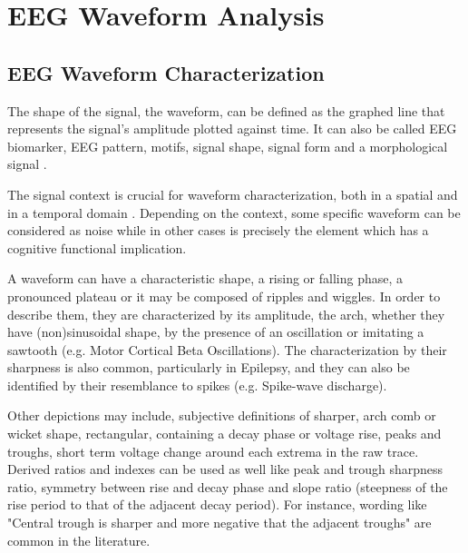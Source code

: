 \section{EEG Waveform Analysis}

\subsection{EEG Waveform Characterization}

The shape of the signal, the waveform, can be defined as the graphed line that represents the signal's amplitude plotted against time. It can also be called EEG biomarker,  EEG pattern, motifs, signal shape, signal form and a morphological signal \cite{Jansen1991}.

The signal context is crucial for waveform characterization, both in a spatial and in a temporal domain \cite{Jansen1991}.  Depending on the context, some specific waveform can be considered as noise while in other cases is precisely the element which has a cognitive functional implication.



%

A waveform can have a characteristic shape, a rising or falling phase, a pronounced plateau or it may be composed of ripples and wiggles. In order to describe them, they are characterized by its amplitude, the arch, whether they have (non)sinusoidal shape, by the presence of an oscillation or imitating a sawtooth (e.g. Motor Cortical Beta Oscillations).  The characterization by their sharpness is also common, particularly in Epilepsy, and they can also be identified by their resemblance to spikes (e.g. Spike-wave discharge).

Other depictions may include, subjective definitions of sharper, arch comb or wicket shape, rectangular, containing a decay phase or voltage rise, peaks and troughs, short term voltage change around each extrema in the raw trace.  Derived ratios and indexes can be used as well like peak and trough sharpness ratio, symmetry between rise and decay phase and slope ratio (steepness of the rise period to that of the adjacent decay period).  For instance,  wording like "Central trough is sharper and more negative that the adjacent troughs" are common in the literature.


